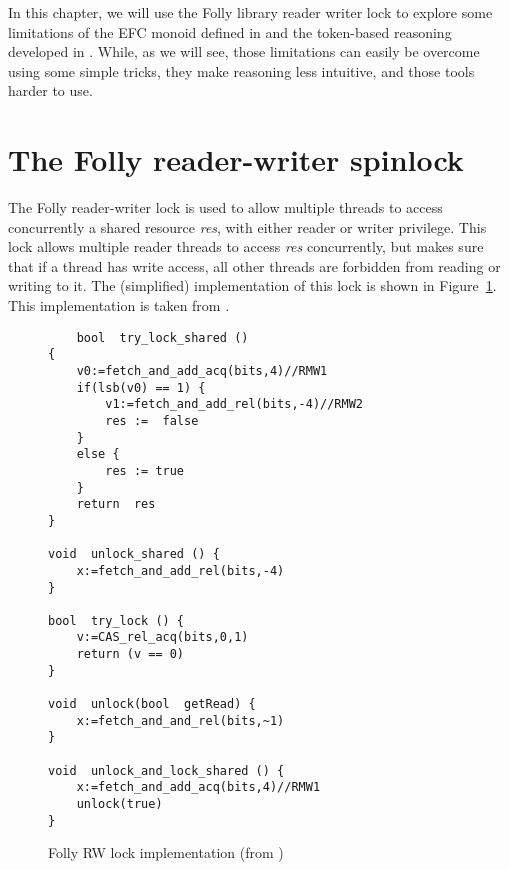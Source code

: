 \label{sec1}
In this chapter, we will use the Folly library reader writer lock \cite{follyRW} to explore some limitations of the EFC monoid defined in \cite{gaurav} and the token-based reasoning developed in \cite{pascal}. While, as we will see, those limitations can easily be overcome using some simple tricks, they make reasoning less intuitive, and those tools harder to use.

\section{The Folly reader-writer spinlock}
The Folly reader-writer lock is used to allow multiple threads to access concurrently a shared resource \emph{res}, with either reader or writer privilege. This lock allows multiple reader threads to access \emph{res} concurrently, but makes sure that if a thread has write access, all other threads are forbidden from reading or writing to it. The (simplified) implementation of this lock is shown in Figure~\ref{fig:follyRWL}. This implementation is taken from \cite{gaurav}.

\begin{figure}
	\begin{lstlisting}
	bool  try_lock_shared ()
{
	v0:=fetch_and_add_acq(bits,4)//RMW1
	if(lsb(v0) == 1) {
		v1:=fetch_and_add_rel(bits,-4)//RMW2
		res :=  false
	}
	else {
		res := true
	}
	return  res
}

void  unlock_shared () {
	x:=fetch_and_add_rel(bits,-4)
}

bool  try_lock () {
	v:=CAS_rel_acq(bits,0,1)
	return (v == 0)
}

void  unlock(bool  getRead) {
	x:=fetch_and_and_rel(bits,~1)
}

void  unlock_and_lock_shared () {
	x:=fetch_and_add_acq(bits,4)//RMW1
	unlock(true)
}
	\end{lstlisting}
\caption{Folly RW lock implementation (from \cite{gaurav})}
		\label{fig:follyRWL}
\end{figure}

